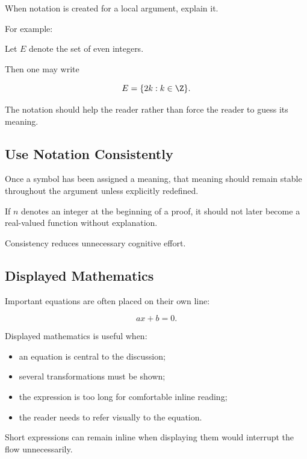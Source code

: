 When notation is created for a local argument, explain it.

For example:

\begin{center}
Let \(E\) denote the set of even integers.
\end{center}

Then one may write

\[ E=\{2k:k\in\Z\}. \]

The notation should help the reader rather than force the reader to guess its
meaning.

\subsection{Use Notation Consistently}
\label{subsec:notation-consistency}

Once a symbol has been assigned a meaning, that meaning should remain stable
throughout the argument unless explicitly redefined.

If \(n\) denotes an integer at the beginning of a proof, it should not later
become a real-valued function without explanation.

Consistency reduces unnecessary cognitive effort.

\subsection{Displayed Mathematics}
\label{subsec:displayed-mathematics}

Important equations are often placed on their own line:

\[ ax+b=0. \]

Displayed mathematics is useful when:

\begin{itemize}
    \item an equation is central to the discussion;
    \item several transformations must be shown;
    \item the expression is too long for comfortable inline reading;
    \item the reader needs to refer visually to the equation.
\end{itemize}

Short expressions can remain inline when displaying them would interrupt the
flow unnecessarily.


